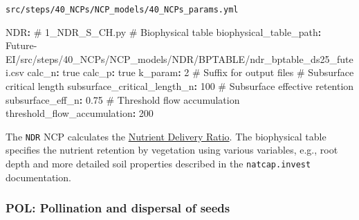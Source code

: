 \documentclass[
  letterpaper,
  DIV=11,
  numbers=noendperiod]{scrreprt}
\newenvironment{Shaded}{\begin{snugshade}}{\end{snugshade}}
\newcommand{\AttributeTok}[1]{\textcolor[rgb]{0.40,0.45,0.13}{#1}}
\newcommand{\CharTok}[1]{\textcolor[rgb]{0.13,0.47,0.30}{#1}}
\newcommand{\CommentTok}[1]{\textcolor[rgb]{0.37,0.37,0.37}{#1}}
\newcommand{\DecValTok}[1]{\textcolor[rgb]{0.68,0.00,0.00}{#1}}
\newcommand{\FloatTok}[1]{\textcolor[rgb]{0.68,0.00,0.00}{#1}}
\newcommand{\FunctionTok}[1]{\textcolor[rgb]{0.28,0.35,0.67}{#1}}
\newcommand{\KeywordTok}[1]{\textcolor[rgb]{0.00,0.23,0.31}{\textbf{#1}}}
\begin{document}
\begin{codelisting}

\caption{\texttt{src/steps/40\_NCPs/NCP\_models/40\_NCPs\_params.yml}}

\begin{Shaded}
\begin{Highlighting}[]
\FunctionTok{NDR}\KeywordTok{:}
\CommentTok{  \# 1\_NDR\_S\_CH.py}
\CommentTok{  \# Biophysical table}
\AttributeTok{  }\FunctionTok{biophysical\_table\_path}\KeywordTok{:}
\AttributeTok{    Future{-}EI/src/steps/40\_NCPs/NCP\_models/NDR/BPTABLE/ndr\_bptable\_ds25\_futei.csv}
\AttributeTok{  }\FunctionTok{calc\_n}\KeywordTok{:}\AttributeTok{ }\CharTok{true}
\AttributeTok{  }\FunctionTok{calc\_p}\KeywordTok{:}\AttributeTok{ }\CharTok{true}
\AttributeTok{  }\FunctionTok{k\_param}\KeywordTok{:}\AttributeTok{ }\DecValTok{2}
\CommentTok{  \# Suffix for output files}
\CommentTok{  \# Subsurface critical length}
\AttributeTok{  }\FunctionTok{subsurface\_critical\_length\_n}\KeywordTok{:}\AttributeTok{ }\DecValTok{100}
\CommentTok{  \# Subsurface effective retention}
\AttributeTok{  }\FunctionTok{subsurface\_eff\_n}\KeywordTok{:}\AttributeTok{ }\FloatTok{0.75}
\CommentTok{  \# Threshold flow accumulation}
\AttributeTok{  }\FunctionTok{threshold\_flow\_accumulation}\KeywordTok{:}\AttributeTok{ }\DecValTok{200}
\end{Highlighting}
\end{Shaded}

\end{codelisting}

The \texttt{NDR} NCP calculates the
\href{https://invest.readthedocs.io/en/latest/models.html\#nutrient-delivery-ratio}{Nutrient
Delivery Ratio}. The biophysical table specifies the nutrient retention
by vegetation using various variables, e.g., root depth and more
detailed soil properties described in the \texttt{natcap.invest}
documentation.

\subsubsection{POL: Pollination and dispersal of seeds}\label{POL}
\end{document}
